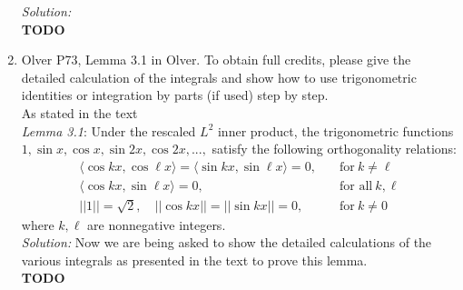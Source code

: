 \documentclass[10pt]{amsart}
\theoremstyle{nonumberplain}
\begin{document}
\begin{enumerate}[label={\bf {\arabic*}:}]
\noindent
\textit{Solution:} \\
\textbf{TODO} \\

\newpage

\item Olver P73, Lemma 3.1 in Olver.
To obtain full credits, please give the detailed calculation of the integrals and show how to use trigonometric identities or integration by parts (if used) step by step. \\

\noindent
As stated in the text \\
\textit{Lemma 3.1}: Under the rescaled $L^2$ inner product, the trigonometric functions $1, \sin x, \cos x, \sin 2 x, \cos 2x , ..., $ satisfy the following orthogonality relations:
\begin{align*}
\langle \cos k x, \cos \ell x \rangle = \langle \sin k x, \sin \ell x \rangle = 0, \quad &\text{for}\: k \neq \ell \\
\langle \cos k x, \sin \ell x \rangle = 0, \quad  &\text{for all}\: k, \ell \\
||1|| = \sqrt 2, \quad || \cos k x || = || \sin k x || = 0,  \quad &\text{for}\: k \neq 0
\end{align*}
where $k, \ell$ are nonnegative integers. \\

\noindent
\textit{Solution:} Now we are being asked to show the detailed calculations of the various integrals as presented in the text to prove this lemma. \\
\textbf{TODO} \\

\end{enumerate}
\end{document}
